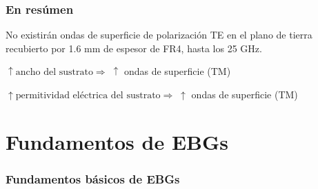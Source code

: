 \documentclass{beamer}
\begin{document}
		\begin{frame}
			\frametitle{En resúmen}
			\begin{block}{}
				\centering
				No existirán ondas de superficie de polarización TE en el plano de tierra recubierto por 1.6 mm de espesor de FR4, hasta los 25 GHz.
			\end{block}
		
			\begin{block}{}
				\centering
				$\uparrow \text{ancho del sustrato} \Rightarrow\; \uparrow$ ondas de superficie (TM)
			\end{block}
			
			\begin{block}{}
				\centering
				$\uparrow \text{permitividad eléctrica del sustrato} \Rightarrow\; \uparrow$ ondas de superficie (TM)
			\end{block}
		\end{frame}
		




\section{Fundamentos de EBGs}
	
	\begin{frame}
	\frametitle{Fundamentos básicos de EBGs}
	\end{frame}
\end{document}
